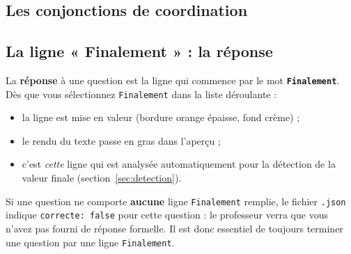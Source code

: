\documentclass[11pt,a4paper]{article}
\begin{document}
\subsection{Les conjonctions de coordination}

\begin{center}
\end{center}

\subsection{La ligne « Finalement » : la réponse}

\begin{retenir}
La \textbf{réponse} à une question est la ligne qui commence par le mot
\textbf{\texttt{Finalement}}. Dès que vous sélectionnez \texttt{Finalement} dans
la liste déroulante :
\begin{itemize}
  \item la ligne est mise en valeur (bordure orange épaisse, fond crème) ;
  \item le rendu du texte passe en gras dans l'aperçu ;
  \item c'est \emph{cette} ligne qui est analysée automatiquement pour la
        détection de la valeur finale (section~\ref{sec:detection}).
\end{itemize}
\end{retenir}

\begin{attention}
Si une question ne comporte \textbf{aucune} ligne \texttt{Finalement} remplie,
le fichier \texttt{.json} indique \texttt{correcte: false} pour cette question :
le professeur verra que vous n'avez pas fourni de réponse formelle. Il est donc
essentiel de toujours terminer une question par une ligne \texttt{Finalement}.
\end{attention}
\end{document}
